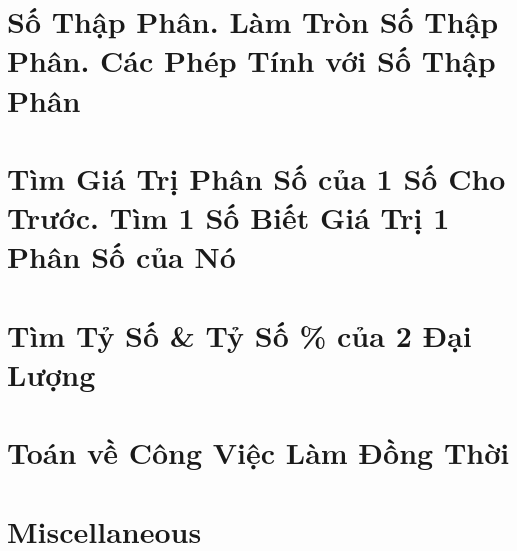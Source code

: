 \documentclass{article}
\begin{document}

\section{Số Thập Phân. Làm Tròn Số Thập Phân. Các Phép Tính với Số Thập Phân}


\section{Tìm Giá Trị Phân Số của 1 Số Cho Trước. Tìm 1 Số Biết Giá Trị 1 Phân Số của Nó}


\section{Tìm Tỷ Số \& Tỷ Số \% của 2 Đại Lượng}


\section{Toán về Công Việc Làm Đồng Thời}


\section{Miscellaneous}


\printbibliography[heading=bibintoc]
	
\end{document}
